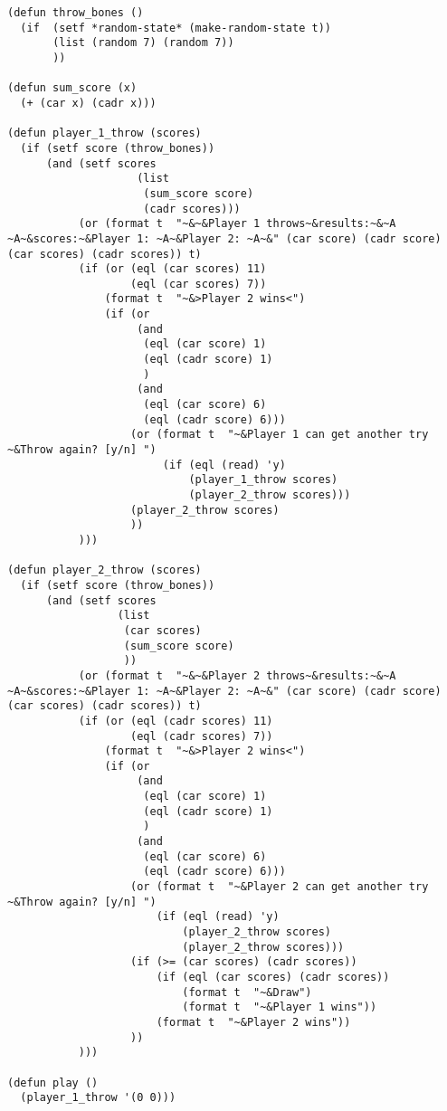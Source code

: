 \begin{lstlisting}
(defun throw_bones ()
  (if  (setf *random-state* (make-random-state t))
       (list (random 7) (random 7))
       ))

(defun sum_score (x)
  (+ (car x) (cadr x)))

(defun player_1_throw (scores)
  (if (setf score (throw_bones))
      (and (setf scores
                    (list
                     (sum_score score)
                     (cadr scores)))
           (or (format t  "~&~&Player 1 throws~&results:~&~A ~A~&scores:~&Player 1: ~A~&Player 2: ~A~&" (car score) (cadr score) (car scores) (cadr scores)) t)
           (if (or (eql (car scores) 11)
                   (eql (car scores) 7))
               (format t  "~&>Player 2 wins<")
               (if (or
                    (and
                     (eql (car score) 1)
                     (eql (cadr score) 1)
                     )
                    (and
                     (eql (car score) 6)
                     (eql (cadr score) 6)))
                   (or (format t  "~&Player 1 can get another try ~&Throw again? [y/n] ")
                        (if (eql (read) 'y)
                            (player_1_throw scores)
                            (player_2_throw scores)))
                   (player_2_throw scores)
                   ))
           )))

(defun player_2_throw (scores)
  (if (setf score (throw_bones))
      (and (setf scores
                 (list
                  (car scores)
                  (sum_score score)
                  ))
           (or (format t  "~&~&Player 2 throws~&results:~&~A ~A~&scores:~&Player 1: ~A~&Player 2: ~A~&" (car score) (cadr score) (car scores) (cadr scores)) t)
           (if (or (eql (cadr scores) 11)
                   (eql (cadr scores) 7))
               (format t  "~&>Player 2 wins<")
               (if (or
                    (and
                     (eql (car score) 1)
                     (eql (cadr score) 1)
                     )
                    (and
                     (eql (car score) 6)
                     (eql (cadr score) 6)))
                   (or (format t  "~&Player 2 can get another try ~&Throw again? [y/n] ")
                       (if (eql (read) 'y)
                           (player_2_throw scores)
                           (player_2_throw scores)))
                   (if (>= (car scores) (cadr scores))
                       (if (eql (car scores) (cadr scores))
                           (format t  "~&Draw")
                           (format t  "~&Player 1 wins"))
                       (format t  "~&Player 2 wins"))
                   ))
           )))

(defun play ()
  (player_1_throw '(0 0)))
\end{lstlisting}